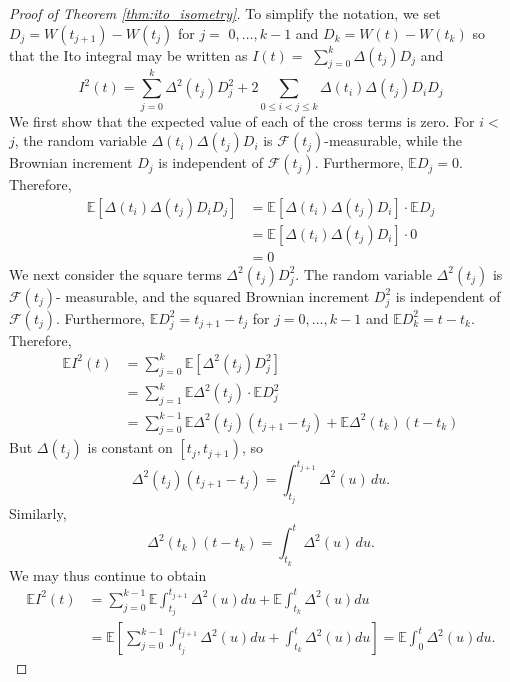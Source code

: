 \documentclass[\topdir/lecture\_notes.tex]{subfiles}
\begin{document}
\begin{optional}
\begin{proof}[Proof of Theorem \ref{thm:ito_isometry}]
To simplify the notation, we set \(D_{j}=W\left(t_{j+1}\right)-W\left(t_{j}\right)\) for \(j=\) \(0, \ldots, k-1\) and \(D_{k}=W(t)-W\left(t_{k}\right)\) so that the Ito integral may be written as \(I(t)=\) \(\sum_{j=0}^{k} \Delta\left(t_{j}\right) D_{j}\) and
\begin{equation*}
I^{2}(t)=\sum_{j=0}^{k} \Delta^{2}\left(t_{j}\right) D_{j}^{2}+2 \sum_{0 \leq i<j \leq k} \Delta\left(t_{i}\right) \Delta\left(t_{j}\right) D_{i} D_{j}
\end{equation*}
We first show that the expected value of each of the cross terms is zero. For \(i<\) \(j\), the random variable \(\Delta\left(t_{i}\right) \Delta\left(t_{j}\right) D_{i}\) is \(\mathcal{F}\left(t_{j}\right)\)-measurable, while the Brownian increment \(D_{j}\) is independent of \(\mathcal{F}\left(t_{j}\right)\). Furthermore, \(\mathbb{E} D_{j}=0\). Therefore,
\begin{align*}
\mathbb{E}\left[\Delta\left(t_{i}\right) \Delta\left(t_{j}\right) D_{i} D_{j}\right]&=\mathbb{E}\left[\Delta\left(t_{i}\right) \Delta\left(t_{j}\right) D_{i}\right] \cdot \mathbb{E} D_{j}\\
&=\mathbb{E}\left[\Delta\left(t_{i}\right) \Delta\left(t_{j}\right) D_{i}\right] \cdot 0\\
&=0
\end{align*}
We next consider the square terms \(\Delta^{2}\left(t_{j}\right) D_{j}^{2}\). The random variable \(\Delta^{2}\left(t_{j}\right)\) is \(\mathcal{F}\left(t_{j}\right)\)- measurable, and the squared Brownian increment \(D_{j}^{2}\) is independent of \(\mathcal{F}\left(t_{j}\right)\). Furthermore, \(\mathbb{E} D_{j}^{2}=t_{j+1}-t_{j}\) for \(j=0, \ldots, k-1\) and \(\mathbb{E} D_{k}^{2}=t-t_{k}\). Therefore,
\begin{align}
\mathbb{E} I^{2}(t) & =\sum_{j=0}^{k} \mathbb{E}\left[\Delta^{2}\left(t_{j}\right) D_{j}^{2}\right]\\
&=\sum_{j=1}^{k} \mathbb{E} \Delta^{2}\left(t_{j}\right) \cdot \mathbb{E} D_{j}^{2} \\
& =\sum_{j=0}^{k-1} \mathbb{E} \Delta^{2}\left(t_{j}\right)\left(t_{j+1}-t_{j}\right)+\mathbb{E} \Delta^{2}\left(t_{k}\right)\left(t-t_{k}\right)
\label{4.2.7}
\end{align}
But \(\Delta\left(t_{j}\right)\) is constant on \(\left[t_{j}, t_{j+1}\right)\), so
\[
\Delta^{2}(t_{j})(t_{j+1}-t_{j})=\int_{t_{j}}^{t_{j+1}} \Delta^{2}(u)\, d u.
\]
Similarly,
\[
\Delta^{2}(t_{k})(t-t_{k})=\int_{t_{k}}^{t} \Delta^{2}(u)\, d u.
\]
We may thus continue to obtain
\begin{align*}
\mathbb{E} I^{2}(t) & =\sum_{j=0}^{k-1} \mathbb{E} \int_{t_{j}}^{t_{j+1}} \Delta^{2}(u) d u+\mathbb{E} \int_{t_{k}}^{t} \Delta^{2}(u) d u \\
& =\mathbb{E}\left[\sum_{j=0}^{k-1} \int_{t_{j}}^{t_{j+1}} \Delta^{2}(u) d u+\int_{t_{k}}^{t} \Delta^{2}(u) d u\right]=\mathbb{E} \int_{0}^{t} \Delta^{2}(u) du.
\end{align*}
\end{proof}


\end{optional}
\end{document}
